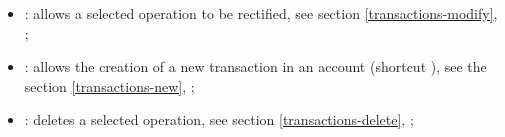 \vspace{3mm}
\noindent
\begin{minipage}{.7\linewidth}
	\begin{itemize}[rightmargin=.6cm]
		\item {}: allows a selected operation to be rectified, see section \vref{transactions-modify}, ;%
		\item {}: allows the creation of a new transaction in an account (shortcut ), see the section \vref{transactions-new}, ;%
		\item {}: deletes a selected operation, see section \vref{transactions-delete}, ;
	\end{itemize}
\end{minipage}
\hspace{10pt}	
